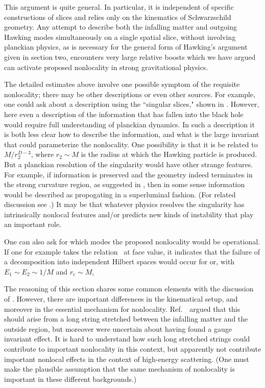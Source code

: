 This argument is quite general.  In particular, it is independent of specific constructions of slices and relies only on the kinematics of Schwarzschild geometry.  Any attempt to describe both the infalling matter and outgoing Hawking modes simultaneously on a single spatial slice, without involving planckian physics, as is necessary for the general form of Hawking's argument given in section two, encounters very large relative boosts which we have argued can activate proposed nonlocality in strong gravitational physics.

The detailed estimates above involve one possible symptom of the requisite nonlocality; there may be other descriptions or even other sources.  For example, one could ask about a description using the ``singular slices," shown in \singslice. However, here even a  description of the information that has fallen into the black hole would require full understanding of planckian dynamics.  In such a description it is both less clear how to describe the information, and what is the large invariant that could parameterize the nonlocality.   One possibility is that it is  be related to $M/r_2^{D-3}$, where $r_2\sim M$ is the radius at which the Hawking particle is produced.  But a planckian resolution of the singularity would have other strange features.  For example, if information is preserved and the geometry indeed terminates in the strong curvature region, as suggested in \singslice, then in some sense information would be described as propogating in a superluminal fashion.  (For related discussion see \BHMR.)  It may be that whatever physics resolves the singularity has intrinsically nonlocal features and/or predicts new kinds of instability that play an important role.


One can also ask for which modes the proposed nonlocality would be operational.  If one for example takes the relation \locbd\ at face value, it indicates that the failure of a decomposition into independent Hilbert spaces would occur for
%
\eqn{}
%
or, with $E_1\sim E_2\sim 1/M$ and $r_c\sim M$,
%
\eqn{}
%

The reasoning of this section shares some common elements with the discussion of \LPSTU.  However, there are important differences in the kinematical setup, and moreover in the essential mechanism for nonlocality.  Ref.~\LPSTU\ argued that this should arise from a long string stretched between the infalling matter and the outside region, but moreover were uncertain about having found a gauge invariant effect\Polchrev.  It is hard to understand how such long stretched strings could contribute to important nonlocality in this context, but apparently not contribute important nonlocal effects in the context of high-energy scattering\SGloc.  (One must make the plausible assumption that the same mechanism of nonlocality is important in these different backgrounds.)

